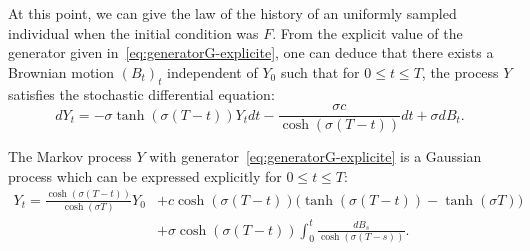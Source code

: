 \documentclass[10pt]{amsart}
\theoremstyle{definition}\newtheorem{defi}[theo]{Definition}\newtheorem{rema}[theo]{Remark}\newtheorem{exam}[theo]{Example}\newtheorem{exem}[theo]{Example}\newtheorem{nota}[theo]{Notation}
\begin{document}
At this point, we can give the law of the history of an uniformly sampled individual when the initial condition was $F$. From the explicit value of the generator given in~\eqref{eq:generatorG-explicite}, one can deduce that there exists a Brownian motion $(B_{t})_{t}$ independent of $Y_0$ such that for $0\leq t \leq T$, the process $Y$ satisfies the stochastic differential equation:
\begin{equation}\label{SDE-Y}
dY_{t}=-\sigma \tanh(\sigma(T-t))Y_{t}dt - \frac{\sigma c}{\cosh (\sigma(T-t))} dt+\sigma d B_{t}.
\end{equation}

\begin{prop}\label{prop:Ytilde-resolu}
The Markov process $Y$ with generator~\eqref{eq:generatorG-explicite} is a Gaussian process which can be expressed explicitly for $0\leq t\leq T$:
\begin{equation}\label{eq:Ytilde-resolu}
\begin{split}
Y_t= \frac{\cosh(\sigma(T-t))}{\cosh(\sigma T)}Y_0 &+ c \cosh(\sigma(T-t)) \big(\tanh(\sigma(T-t))-\tanh(\sigma T)\big)\\
&+\sigma \cosh(\sigma(T-t)) \int_{0}^{t}\frac{dB_s}{\cosh(\sigma(T-s))}.
\end{split}
\end{equation}
\end{prop}
\end{document}
